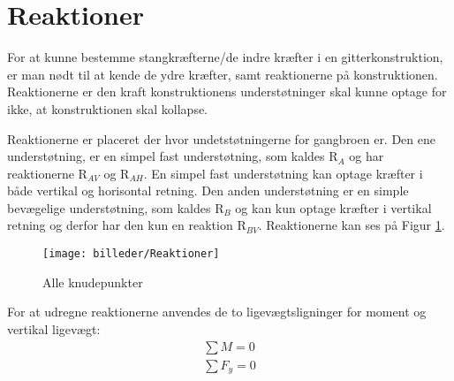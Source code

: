 \section{Reaktioner} \label{kap:Reaktion}
For at kunne bestemme stangkræfterne/de indre kræfter i en gitterkonstruktion, er man nødt til at kende de ydre kræfter, samt reaktionerne på konstruktionen. Reaktionerne er den kraft konstruktionens understøtninger skal kunne optage for ikke, at konstruktionen skal kollapse.

Reaktionerne er placeret der hvor undetstøtningerne for gangbroen er. Den ene understøtning, er en simpel fast understøtning, som kaldes R$_{A}$ og har reaktionerne R$_{AV}$ og R$_{AH}$. En simpel fast understøtning kan optage kræfter i både vertikal og horisontal retning. Den anden understøtning er en simple bevægelige understøtning, som kaldes R$_{B}$ og kan kun optage kræfter i vertikal retning og derfor har den kun en reaktion R$_{BV}$. Reaktionerne kan ses på Figur \ref{fig:reaktioner}.
 
\begin{figure} [H]
\centering
\texttt{[image: billeder/Reaktioner]}
\caption{Alle knudepunkter}
\label{fig:reaktioner}
\end{figure}  
 
For at udregne reaktionerne anvendes de to ligevægtsligninger for moment og vertikal ligevægt:
\begin{align*}
\sum M = 0 \\
\sum F_{y} = 0
\end{align*}

